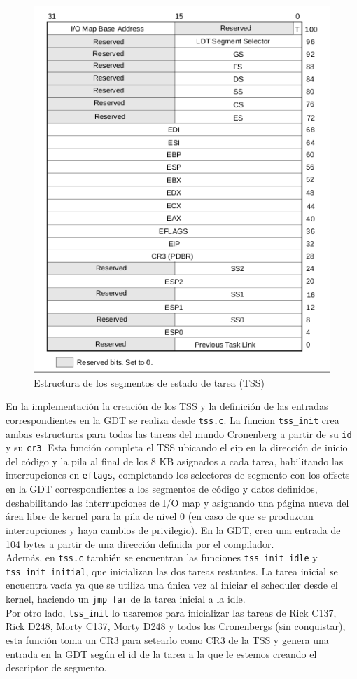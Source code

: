 \documentclass[a4paper]{article}
\begin{document}
\begin{figure}[!htb]
  \begin{center}
	\includegraphics[scale=0.6]{img/tssEstructura.png}
	\caption{Estructura de los segmentos de estado de tarea (TSS)}
  \end{center}
\end{figure}

En la implementación la creación de los TSS y la definición de las entradas correspondientes en la GDT se realiza desde {\tt tss.c}. La funcion {\tt tss_init} crea ambas estructuras para todas las tareas del mundo Cronenberg a partir de su {\tt id} y su {\tt cr3}. Esta función completa el TSS ubicando el eip en la dirección de inicio del código y la pila al final de los 8 KB asignados a cada tarea, habilitando las interrupciones en {\tt eflags}, completando los selectores de segmento con los offsets en la GDT correspondientes a los segmentos de código y datos definidos, deshabilitando las interrupciones de I/O map y asignando una página nueva del área libre de kernel para la pila de nivel 0 (en caso de que se produzcan interrupciones y haya cambios de privilegio). En la GDT, crea una entrada de 104 bytes a partir de una dirección definida por el compilador. \\
Además, en {\tt tss.c} también se encuentran las funciones {\tt tss_init_idle} y {\tt tss_init_initial}, que inicializan las dos tareas restantes. La tarea inicial se encuentra vacía ya que se utiliza una única vez al iniciar el scheduler desde el kernel, haciendo un {\tt jmp far} de la tarea inicial a la idle. \\
Por otro lado, {\tt tss_init} lo usaremos para inicializar las tareas de Rick C137, Rick D248, Morty C137, Morty D248 y todos los Cronenbergs (sin conquistar), esta función toma un CR3 para setearlo como CR3 de la TSS y genera una entrada en la GDT según el id de la tarea a la que le estemos creando el descriptor de segmento.
\end{document}
